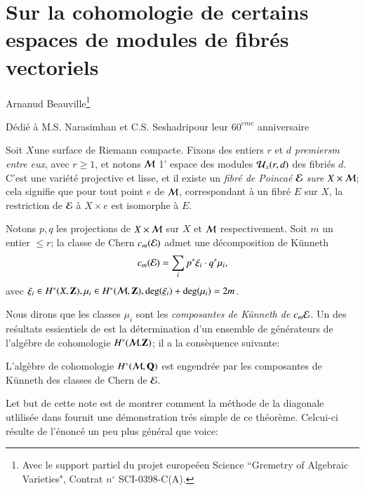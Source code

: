 \chapter{Sur la cohomologie de certains espaces de modules de fibr\'es vectoriels}\label{chap3}


\begin{center}
Arnanud Beauville\footnote{Avec le support partiel du projet europe\'een Science ``Gremetry of Algebraic Varieties", Contrat $n^{\circ}$ SCI-0398-C(A).}

\medskip
D\'edi\'e \`a M.S. Narasimhan et C.S. Seshadri\break pour leur $60^{{\grave{e}}me}$ anniversaire
\end{center}


Soit $X$\pageoriginale une surface de Riemann compacte. Fixons des entiers $r$ et $d$ \textit{premiersm entre eux}, avec $r\geq 1$, et notons $\mathcal{M}$ 1' espace des modules $\mathcal{U}_{x}(r,d)$ des fibri\'es $d$. C'est une vari\'et\'e projective et lisse, et il existe un \textit{fibr\'e de Poinca\'e $\bf\mathcal{E}$ sure $X \times \mathcal{M}$}; cela signifie que pour tout point $e$ de $\mathcal{M}$, correspondant \`a un fibr\'e $E$ sur $X$, la restriction de $\mathcal{E}$ \`a $X \times{e}$ est isomorphe \`a $E$.  

Notons $p,q$ les projections de $X \times \mathcal{M}$ sur $X$ et $\mathcal{M}$ respectivement. Soit $m$ un entier $\leq r$; la 
classe de Chern $c_{m}(\mathcal{E})$ admet une d\'ecomposition de K\"unneth
$$
c_{m}(\mathcal{E}) = \sum\limits_{i}p^{*}\xi_{i} \cdot q^{*} \mu_{i}, 
$$
avec $\xi_{i} \in H ^{*}(X, \mathbf{Z}), \mu_{i} \in H^{*}(\mathcal{M}, \mathbf{Z}),\deg(\xi_{i}) + \deg(\mu_{i}) =2m$. 

Nous dirons que les classes $\mu_{i}$ sont les \textit{composantes de K\"unneth de $c_{m}{\mathcal{E}}$}. Un des re\'sultats essientiels de \cite{chap3-keyA-B} est la d\'etermination d'un ensemble de g\'en\'erateurs de l'alg\'ebre de cohomologie $H^{*}(\mathcal{M}. \mathbf{Z})$; il a la cons\`equence suivante:

\begin{theoreme*}
L'alg\`ebre de cohomologie $H^{*} (\mathcal{M}, \mathbf{Q})$ est engendr\'ee par les composantes de K\"unneth des classes de Chern de ${\mathcal{E}}$. 
\end{theoreme*}

Let but de cette note est de montrer comment la m\'ethode de la diagonale utlilis\'ee dans \cite{chap3-keyE-S} fournit une d\'emonstration tr\'es simple de ce th\'eor\`eme. Celcui-ci r\'esulte de l'\'enonc\'e un peu plus g\'en\'eral que voice:

